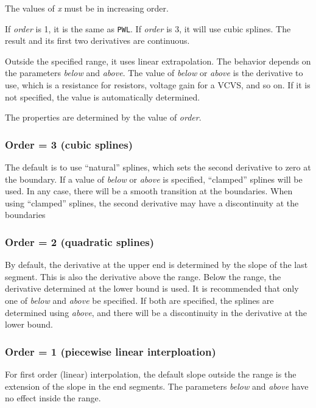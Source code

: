 The values of {\it x} must be in increasing order.

If {\em order} is 1, it is the same as {\tt PWL}.  If {\em order} is
3, it will use cubic splines.  The result and its first two
derivatives are continuous.

Outside the specified range, it uses linear extrapolation.  The
behavior depends on the parameters {\em below} and {\em above}.  The
value of {\em below} or {\em above} is the derivative to use, which
is a resistance for resistors, voltage gain for a VCVS, and so on.  If 
it is not specified, the value is automatically determined.

The properties are determined by the value of {\em order}.

\subsubsection{Order = 3 (cubic splines)}

The default is to use ``natural'' splines, which sets the second
derivative to zero at the boundary.  If a value of {\em below} or
{\em above} is specified, ``clamped'' splines will be used.  In any
case, there will be a smooth transition at the boundaries.  When using
``clamped'' splines, the second derivative may have a discontinuity at
the boundaries

\subsubsection{Order = 2 (quadratic splines)}

By default, the derivative at the upper end is determined by the slope
of the last segment.  This is also the derivative above the range.
Below the range, the derivative determined at the lower bound is used.
It is recommended that only one of {\em below} and {\em above} be
specified.  If both are specified, the splines are determined using
{\em above}, and there will be a discontinuity in the derivative at
the lower bound.

\subsubsection{Order = 1 (piecewise linear interploation)}

For first order (linear) interpolation, the default slope outside the
range is the extension of the slope in the end segments.  The
parameters {\em below} and {\em above} have no effect inside the
range.

